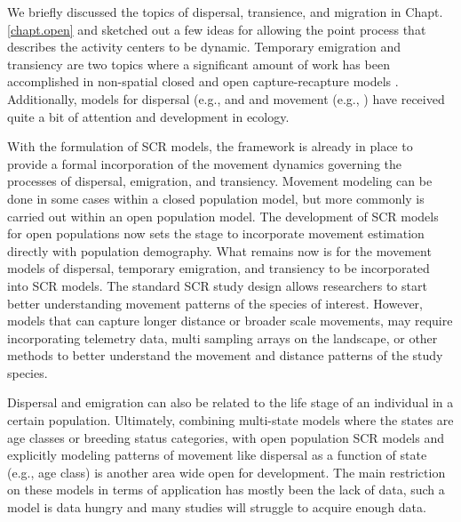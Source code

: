 We briefly discussed the topics of dispersal,
transience, and migration in Chapt. \ref{chapt.open} and sketched out
a few ideas for allowing the point process that describes the activity centers
to be dynamic. %
Temporary emigration and transiency are two topics where
a significant amount of work has been accomplished in non-spatial closed and open capture-recapture
models \citep{kendall_etal:1997, pradel_hines:1997, hines_etal:2003,
clavel_etal:2008, gilroy_etal:2012,chandler_etal:2011}.
Additionally, models for dispersal (e.g., \citet{clobert_etal:2001,
ovaskainen:2004, ovaskainen_etal:2008} and
and movement (e.g., \cite{jonsen_etal:2005, johnson_etal:2008b,
mcclintock_etal:2012}) have received quite a bit of attention and development in
ecology.

With the formulation of SCR models, the framework is already in place to provide
a formal incorporation of the movement dynamics governing the processes
of dispersal, emigration, and transiency. Movement modeling can be done
in some cases within a closed
population model, but more commonly is carried out within an open population model.
The development of SCR models for open populations \citep{gardner_etal:2012} now sets
the stage to incorporate
movement estimation directly with population demography. What remains now is for the
movement models
of dispersal, temporary emigration, and transiency to be incorporated into SCR models.
The standard SCR study design allows researchers to start better understanding movement patterns of
the species of interest.  However, models that can capture longer distance or broader scale movements,
may require incorporating telemetry data, multi sampling arrays on the landscape, or other
methods to better understand the movement and distance patterns of the study species.

Dispersal and emigration can also be related to the life stage of an individual in
a certain population.  Ultimately, combining multi-state models where the states are
age classes or breeding status categories, with open population SCR models and explicitly
modeling patterns of movement like dispersal as a function of state (e.g., age class) is
another area wide open for development.  The main restriction on these models in terms
of application has mostly been the lack of data, such a model is data hungry and many studies
will struggle to acquire enough data.



